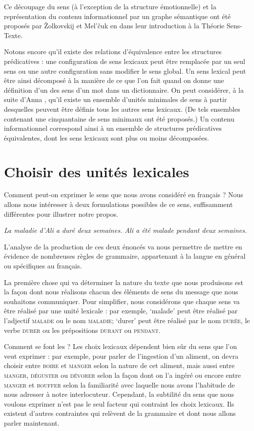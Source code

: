 {    Ce découpage du sens (à l’exception de la structure émotionnelle) et la représentation du contenu informationnel par un graphe sémantique ont été proposés par Žolkovskij et Mel’čuk en \citeyear{zolkovski1967semanticeskom} dans leur introduction à la Théorie Sens-Texte.

    Notons encore qu’il existe des relations d’équivalence entre les structures prédicatives : une configuration de sens lexicaux peut être remplacée par un seul sens ou une autre configuration sans modifier le sens global. Un sens lexical peut être ainsi décomposé à la manière de ce que l’on fait quand on donne une définition d’un des sens d’un mot dans un dictionnaire. On peut considérer, à la suite d’Anna \citet{wierzbivcka1980lingua}, qu’il existe un ensemble d’unités minimales de sens à partir desquelles peuvent être définis tous les autres sens lexicaux. (De tels ensembles contenant une cinquantaine de sens minimaux ont été proposés.) Un contenu informationnel correspond ainsi à un ensemble de structures prédicatives équivalentes, dont les sens lexicaux sont plus ou moins décomposées.
}
\section{Choisir des unités lexicales}\label{sec:1.2.5}

Comment peut-on exprimer le sens que nous avons considéré en français ? Nous allons nous intéresser à deux formulations possibles de ce sens, suffisamment différentes pour illustrer notre propos.

\ea\label{ex:maladie}
\ea
          \itshape La maladie d’Ali a duré deux semaines.
\ex
           \itshape Ali a été malade pendant deux semaines.
\z\z

L’analyse de la production de ces deux énoncés va nous permettre de mettre en évidence de nombreuses règles de grammaire, appartenant à la langue en général ou spécifiques au français.

La première chose qui va déterminer la nature du texte que nous produisons est la façon dont nous réalisons chacun des éléments de sens du message que nous souhaitons communiquer. Pour simplifier, nous considérons que chaque sens va être réalisé par une unité lexicale : par exemple, ‘malade’ peut être réalisé par l’adjectif \textsc{malade} ou le nom \textsc{maladie}; ‘durer’ peut être réalisé par le nom \textsc{durée}, le verbe \textsc{durer} ou les prépositions \textsc{durant} ou \textsc{pendant}.

Comment se font les ? Les choix lexicaux dépendent bien sûr du sens que l’on veut exprimer : par exemple, pour parler de l’ingestion d’un aliment, on devra choisir entre \textsc{boire} et \textsc{manger} selon la nature de cet aliment, mais aussi entre \textsc{manger}, \textsc{déguster} ou \textsc{dévorer} selon la façon dont on l’a ingéré ou encore entre \textsc{manger} et \textsc{bouffer} selon la familiarité avec laquelle nous avons l’habitude de nous adresser à notre interlocuteur. Cependant, la subtilité du sens que nous voulons exprimer n’est pas le seul facteur qui contraint les choix lexicaux. Ils existent d’autres contraintes qui relèvent de la grammaire et dont nous allons parler maintenant.

